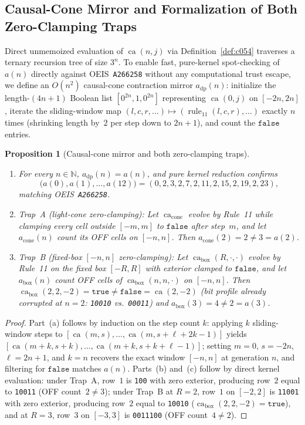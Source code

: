 \documentclass[11pt]{article}
\newtheorem{proposition}[theorem]{Proposition}
\theoremstyle{definition}
\newcommand{\N}{\mathbb{N}}
\newcommand{\seq}[1]{\texttt{#1}}
\newcommand{\ruleTT}{\operatorname{rule}_{11}}
\newcommand{\ca}{\operatorname{ca}}
\begin{document}
\subsection{Causal-Cone Mirror and Formalization of Both Zero-Clamping Traps}

Direct unmemoized evaluation of $\ca(n, j)$ via Definition~\ref{def:c054} traverses a ternary recursion tree of size $3^n$. To enable fast, pure-kernel spot-checking of $a(n)$ directly against OEIS~\seq{A266258} without any computational trust escape, we define an $O(n^2)$ causal-cone contraction mirror $a_{\mathrm{dp}}(n)$: initialize the length-$(4n + 1)$ Boolean list $[0^{2n}, 1, 0^{2n}]$ representing $\ca(0, j)$ on $[-2n, 2n]$, iterate the sliding-window map $(l, c, r, \dots) \mapsto (\ruleTT(l, c, r), \dots)$ exactly $n$ times (shrinking length by~$2$ per step down to $2n + 1$), and count the $\mathtt{false}$ entries.

\begin{proposition}[Causal-cone mirror and both zero-clamping traps]
\label{prop:clamping-traps}
\begin{enumerate}
\item[\textup{(a)}] For every $n \in \N$, $a_{\mathrm{dp}}(n) = a(n)$, and pure kernel reduction confirms
\[
\bigl(a(0), a(1), \dots, a(12)\bigr) = (0, 2, 3, 2, 7, 2, 11, 2, 15, 2, 19, 2, 23),
\]
matching OEIS~\seq{A266258}.
\item[\textup{(b)}] \emph{Trap~A (light-cone zero-clamping):} Let $\ca_{\mathrm{cone}}$ evolve by Rule~11 while clamping every cell outside $[-m, m]$ to $\mathtt{false}$ after step~$m$, and let $a_{\mathrm{cone}}(n)$ count its OFF cells on $[-n, n]$. Then $a_{\mathrm{cone}}(2) = 2 \ne 3 = a(2)$.
\item[\textup{(c)}] \emph{Trap~B (fixed-box $[-n, n]$ zero-clamping):} Let $\ca_{\mathrm{box}}(R, \cdot, \cdot)$ evolve by Rule~11 on the fixed box $[-R, R]$ with exterior clamped to $\mathtt{false}$, and let $a_{\mathrm{box}}(n)$ count OFF cells of $\ca_{\mathrm{box}}(n, n, \cdot)$ on $[-n, n]$. Then $\ca_{\mathrm{box}}(2, 2, -2) = \mathtt{true} \ne \mathtt{false} = \ca(2, -2)$ (bit profile already corrupted at $n = 2$: \texttt{10010} vs.\ \texttt{00011}) and $a_{\mathrm{box}}(3) = 4 \ne 2 = a(3)$.
\end{enumerate}
\end{proposition}

\begin{proof}
Part~(a) follows by induction on the step count $k$: applying $k$ sliding-window steps to $[\ca(m, s), \dots, \ca(m, s + \ell + 2k - 1)]$ yields $[\ca(m + k, s + k), \dots, \ca(m + k, s + k + \ell - 1)]$; setting $m = 0$, $s = -2n$, $\ell = 2n + 1$, and $k = n$ recovers the exact window $[-n, n]$ at generation $n$, and filtering for $\mathtt{false}$ matches $a(n)$. Parts~(b) and~(c) follow by direct kernel evaluation: under Trap~A, row~$1$ is \texttt{100} with zero exterior, producing row~$2$ equal to \texttt{10011} (OFF count~$2 \ne 3$); under Trap~B at $R = 2$, row~$1$ on $[-2, 2]$ is \texttt{11001} with zero exterior, producing row~$2$ equal to \texttt{10010} ($\ca_{\mathrm{box}}(2, 2, -2) = \mathtt{true}$), and at $R = 3$, row~$3$ on $[-3, 3]$ is \texttt{0011100} (OFF count~$4 \ne 2$).
\end{proof}
\end{document}
